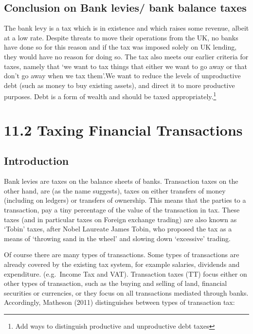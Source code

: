 \documentclass[]{tufte-handout}
\begin{document}
\hypertarget{conclusion-on-bank-levies-bank-balance-taxes}{%
\subsection{Conclusion on Bank levies/ bank balance
taxes}\label{conclusion-on-bank-levies-bank-balance-taxes}}

The bank levy is a tax which is in existence and which raises some
revenue, albeit at a low rate. Despite threats to move their operations
from the UK, no banks have done so for this reason and if the tax was
imposed solely on UK lending, they would have no reason for doing so.
The tax also meets our earlier criteria for taxes, namely that `we want
to tax things that either we want to go away or that don't go away when
we tax them'.We want to reduce the levels of unproductive debt (such as
money to buy existing assets), and direct it to more productive
purposes. Debt is a form of wealth and should be taxed
appropriately.\footnote{Add ways to distinguish productive and
  unproductive debt taxes}

\hypertarget{taxing-financial-transactions}{%
\section{11.2 Taxing Financial
Transactions}\label{taxing-financial-transactions}}

\hypertarget{introduction-1}{%
\subsection{Introduction}\label{introduction-1}}

Bank levies are taxes on the balance sheets of banks. Transaction taxes
on the other hand, are (as the name suggests), taxes on either transfers
of money (including on ledgers) or transfers of ownership. This means
that the parties to a transaction, pay a tiny percentage of the value of
the transaction in tax. These taxes (and in particular taxes on Foreign
exchange trading) are also known as `Tobin' taxes, after Nobel Laureate
James Tobin, who proposed the tax as a means of `throwing sand in the
wheel' and slowing down `excessive' trading.

Of course there are many types of transactions. Some types of
transactions are already covered by the existing tax system, for example
salaries, dividends and expenditure. (e.g.~Income Tax and VAT).
Transaction taxes (TT) focus either on other types of transaction, such
as the buying and selling of land, financial securities or currencies,
or they focus on all transactions mediated through banks. Accordingly,
Matheson (2011) distinguishes between types of transaction tax:
\end{document}
